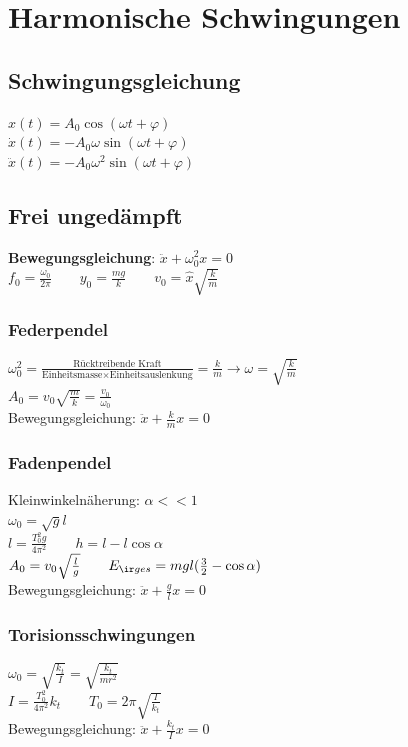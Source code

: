 \documentclass[german]{latex4ei/latex4ei_sheet}
\begin{document}
\section{Harmonische Schwingungen}
\begin{sectionbox}
\subsection{Schwingungsgleichung}
$x(t)=A_0\cos(\omega t + \varphi)$ \\
$\dot{x}(t)=-A_0\omega\sin(\omega t + \varphi)$\\
$\ddot{x}(t)=-A_0\omega^2\sin(\omega t + \varphi)$
\end{sectionbox}

\begin{sectionbox}
\subsection{Frei ungedämpft}
\textbf{Bewegungsgleichung}: $\ddot{x}+\omega_0^2x=0$\\
$f_0=\frac{\omega_0}{2\pi} \qquad y_0=\frac{mg}{k} \qquad v_0 = \hat{x}\sqrt{\frac{k}{m}}$
\subsubsection{Federpendel}
$\omega_0^2=\frac{\text{Rücktreibende Kraft}}{\text{Einheitsmasse} \times \text{Einheitsauslenkung}}=\frac{k}{m} \rightarrow \omega = \sqrt{\frac{k}{m}}$\\
$A_0=v_0\sqrt{\frac{m}{k}}=\frac{v_0}{\omega_0}$\\
Bewegungsgleichung: $\ddot{x}+\frac{k}{m}x=0$
\subsubsection{Fadenpendel}
Kleinwinkelnäherung: $\alpha << 1$\\
$\omega_0=\sqrt{g}{l}$\\
$l=\frac{T_0^2g}{4\pi^2} \qquad h=l-l\cos \alpha$\\
$A_0 = v_0 \sqrt{\frac{l}{g}} \qquad E_{\ir ges} = mgl(\frac{3}{2}-\cos \alpha)$\\
Bewegungsgleichung: $\ddot{x}+\frac{g}{l}x=0$
\subsubsection{Torisionsschwingungen}
$\omega_0 = \sqrt{\frac{k_t}{I}}=\sqrt{\frac{k_t}{mr^2}}$\\
$I=\frac{T_0^2}{4\pi^2}k_t \qquad T_0=2\pi \sqrt{\frac{I}{k_t}}$\\
Bewegungsgleichung: $\ddot{x}+\frac{k_t}{I}x=0$
\end{sectionbox}
\end{document}

